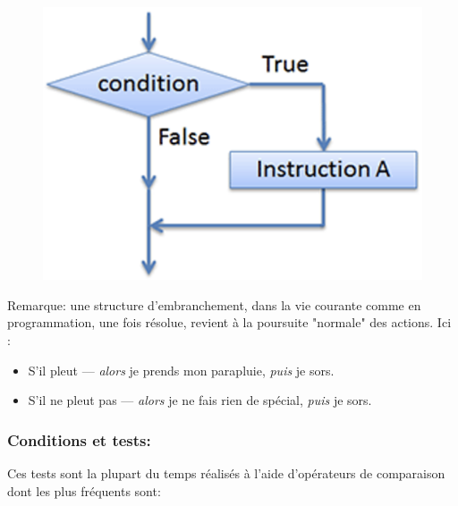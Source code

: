 \documentclass[12pt]{article}
\begin{document}
	\noindent
	\begin{figure}
		\includegraphics[scale=0.20]{012_IfThen.png}
	\end{figure}
	
	Remarque: une structure d'embranchement, dans la vie courante comme en programmation, une fois résolue, revient à la poursuite "normale" des actions. Ici :
	\begin{itemize}
		\item S'il pleut --- \textit{alors} je prends mon parapluie, \textit{puis} je sors.
		\item S'il ne pleut pas --- \textit{alors} je ne fais rien de spécial, \textit{puis} je sors.
	\end{itemize}
		
	\subsubsection*{Conditions et tests:}

	Ces tests sont la plupart du temps réalisés à l’aide d’opérateurs de comparaison dont les plus fréquents sont:	
	
\end{document}
